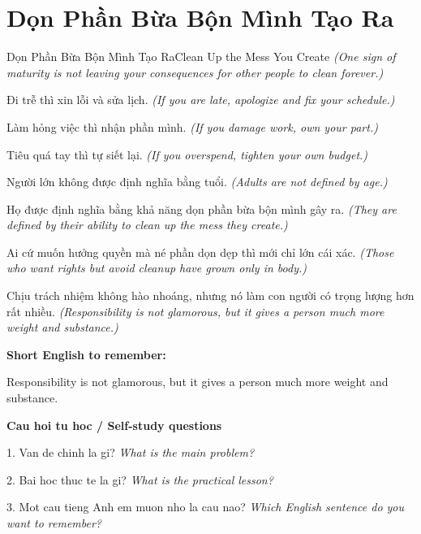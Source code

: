\section{Dọn Phần Bừa Bộn Mình Tạo Ra}
\begin{truyen}{Dọn Phần Bừa Bộn Mình Tạo Ra}{Clean Up the Mess You Create}
\textit{(One sign of maturity is not leaving your consequences for other people to clean forever.)}

Đi trễ thì xin lỗi và sửa lịch.
\textit{(If you are late, apologize and fix your schedule.)}

Làm hỏng việc thì nhận phần mình.
\textit{(If you damage work, own your part.)}

Tiêu quá tay thì tự siết lại.
\textit{(If you overspend, tighten your own budget.)}

Người lớn không được định nghĩa bằng tuổi.
\textit{(Adults are not defined by age.)}

Họ được định nghĩa bằng khả năng dọn phần bừa bộn mình gây ra.
\textit{(They are defined by their ability to clean up the mess they create.)}

Ai cứ muốn hưởng quyền mà né phần dọn dẹp thì mới chỉ lớn cái xác.
\textit{(Those who want rights but avoid cleanup have grown only in body.)}

\end{truyen}

\begin{baihoc}
Chịu trách nhiệm không hào nhoáng, nhưng nó làm con người có trọng lượng hơn rất nhiều.
\textit{(Responsibility is not glamorous, but it gives a person much more weight and substance.)}
\end{baihoc}

\begin{ghinhoanh}
\textbf{Short English to remember:}

Responsibility is not glamorous, but it gives a person much more weight and substance.

\end{ghinhoanh}

\begin{tuhocnhanh}
\textbf{Cau hoi tu hoc / Self-study questions}

1. Van de chinh la gi? \textit{What is the main problem?}

2. Bai hoc thuc te la gi? \textit{What is the practical lesson?}

3. Mot cau tieng Anh em muon nho la cau nao? \textit{Which English sentence do you want to remember?}
\end{tuhocnhanh}
\ngancach

